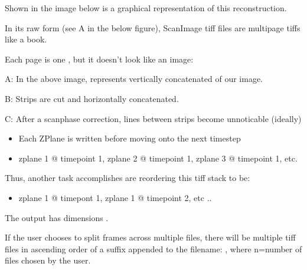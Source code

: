 \documentclass[letterpaper,10pt,english]{sphinxmanual}
\begin{document}
\sphinxAtStartPar
Shown in the image below is a graphical representation of this reconstruction.

\sphinxAtStartPar
In its raw form (see A in the below figure), ScanImage tiff files are multipage tiffs \sphinxhyphen{} like a book.

\sphinxAtStartPar
Each page is one , but it doesn’t look like an image:

\noindent{}

\begin{DUlineblock}{0em}
\item[] A: In the above image, represents vertically concatenated  of our image.
\item[] B: Strips are cut and horizontally concatenated.
\item[] C: After a scan\sphinxhyphen{}phase correction, lines between strips become unnoticable (ideally)
\end{DUlineblock}

\sphinxAtStartPar
{}
\begin{itemize}
\item {} 
\sphinxAtStartPar
Each Z\sphinxhyphen{}Plane is written before moving onto the next timestep

\item {} 
\sphinxAtStartPar
z\sphinxhyphen{}plane 1 @ timepoint 1, z\sphinxhyphen{}plane 2 @ timepoint 1, z\sphinxhyphen{}plane 3 @ timepoint 1, etc.

\end{itemize}

\sphinxAtStartPar
Thus, another task {\hyperref[\detokenize{api/core:convertScanImageTiffToVolume}]{}} accomplishes are reordering this tiff stack to be:
\begin{itemize}
\item {} 
\sphinxAtStartPar
z\sphinxhyphen{}plane 1 @ timepont 1, z\sphinxhyphen{}plane 1 @ timepoint 2, etc ..

\end{itemize}

\sphinxAtStartPar
The output  has dimensions \sphinxtitleref{{[}Y,X,Z,T{]}}.

\sphinxAtStartPar
If the user chooses to split frames across multiple  files, there will be multiple tiff files in ascending order
of a suffix appended to the filename: , where n=number of files chosen by the user.
\end{document}
